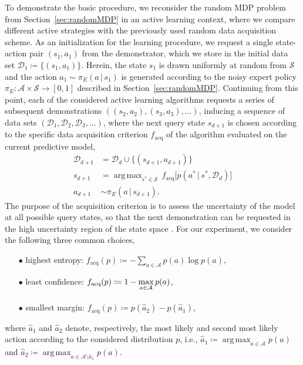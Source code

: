 \documentclass[twoside,11pt]{article}
\newcommand{\given}{\,\vert\,}
\DeclareMathOperator*{\argmax}{arg\,max}
\newcommand{\defeq}{\coloneqq}
\newcommand{\eqpunkt}{.}
\newcommand{\ie}{i.e.}
\begin{document}
To demonstrate the basic %
procedure, we reconsider the random MDP problem from Section~\ref{sec:randomMDP} %
%
%
in an active learning context, where we compare %
different active strategies with %
the %
previously used random data acquisition scheme. %
%
%
%
%
As an initialization for the learning procedure, we %
request %
a single state-action pair $(s_1,a_1)$ from the demonstrator, which we store in the initial data set $\mathcal{D}_1\defeq\{(s_1,a_1)\}$. Herein, the state $s_1$ is drawn uniformly at random from $\mathcal{S}$ and the action %
$a_1\sim\pi_E(a \given s_1)$ is generated according to the %
noisy
expert policy $\pi_E:\mathcal{A}\times\mathcal{S}\rightarrow[0,1]$ described in Section~\ref{sec:randomMDP}. %
Continuing from this point, each of the considered active learning algorithms requests a series of subsequent demonstrations $((s_2,a_2), (s_3,a_3), \ldots)$, %
%
%
inducing a sequence of data sets $(\mathcal{D}_1, \mathcal{D}_2, \mathcal{D}_3, \ldots)$, where the next query state $s_{d+1}$ is chosen %
according to the specific data acquisition criterion $f_\text{acq}$ of the algorithm evaluated on the current predictive model,
\begin{align*}
\mathcal{D}_{d+1} &= \mathcal{D}_{d}\cup\{(s_{d+1}, a_{d+1})\} \\
%
s_{d+1} &= \argmax_{s^*\in\mathcal{S}}\, f_{\text{acq}}\big[p(a^* %
\given s^*, \mathcal{D}_{d})\big] \\ 
a_{d+1} &\sim \pi_E(a \given s_{d+1}) \eqpunkt
\end{align*}
The purpose of the acquisition criterion %
is to assess the uncertainty of the %
model at all possible query states, so that the next demonstration can be requested in the high uncertainty region of the state space \citep[see \textit{uncertainty sampling},][]{settles2010active}.
%
%
For our experiment, we consider the following three common choices,
\begin{enumerate}[topsep=-\parskip+1.5ex, itemsep=1ex, parsep=0mm]
	\item[$\bullet$] highest entropy: \tabto{3.2cm} $f_\text{acq}(p) \defeq -\sum\limits_{a\in\mathcal{A}}p(a) \log p(a)$,
    \item[$\bullet$] least confidence: \tabto{3.2cm} $f_\text{acq}(p) \defeq 1 - \max\limits_{a\in\mathcal{A}}p(a) \vphantom{\sum\limits_{a\in\mathcal{A}}}$,
    \item[$\bullet$] smallest margin: \tabto{3.2cm} $f_\text{acq}(p) \defeq p(\hat{a}_2) - p(\hat{a}_1)$, %
\end{enumerate} 
where $\hat{a}_1$ and $\hat{a}_2$ denote, respectively, the most likely and second most likely action according to the considered distribution $p$, \ie, $\hat{a}_1\defeq\argmax_{a\in\mathcal{A}}p(a)$ and $\hat{a}_2\defeq\argmax_{a\in\mathcal{A}\setminus\hat{a}_1}p(a)$.
\end{document}
